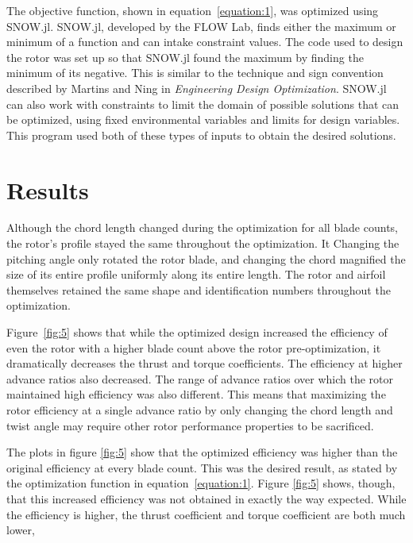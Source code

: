 \documentclass[journal ]{new-aiaa}
\begin{document}
The objective function, shown in equation~\eqref{equation:1}, was optimized using SNOW.jl. SNOW.jl, developed by the FLOW Lab, finds either the maximum or minimum of a function and can intake constraint values. The code used to design the rotor was set up so that SNOW.jl found the maximum by finding the minimum of its negative. This is similar to the technique and sign convention described by Martins and Ning in \emph{Engineering Design Optimization}\cite{EngDesOpt}. SNOW.jl can also work with constraints to limit the domain of possible solutions that can be optimized, using fixed environmental variables and limits for design variables. This program used both of these types of inputs to obtain the desired solutions.


\section{Results}

Although the chord length changed during the optimization for all blade counts, the rotor's profile stayed the same throughout the optimization. It Changing the pitching angle only rotated the rotor blade, and changing the chord magnified the size of its entire profile uniformly along its entire length. The rotor and airfoil themselves retained the same shape and identification numbers throughout the optimization.

Figure~\eqref{fig:5} shows that while the optimized design increased the efficiency of even the rotor with a higher blade count above the rotor pre-optimization, it dramatically decreases the thrust and torque coefficients. The efficiency at higher advance ratios also decreased. The range of advance ratios over which the rotor maintained high efficiency was also different. This means that maximizing the rotor efficiency at a single advance ratio by only changing the chord length and twist angle may require other rotor performance properties to be sacrificed.

The plots in figure \eqref{fig:5} show that the optimized efficiency was higher than the original efficiency at every blade count. This was the desired result, as stated by the optimization function in equation~\eqref{equation:1}. Figure \eqref{fig:5} shows, though, that this increased efficiency was not obtained in exactly the way expected. While the efficiency is higher, the thrust coefficient and torque coefficient are both much lower, 
\end{document}
